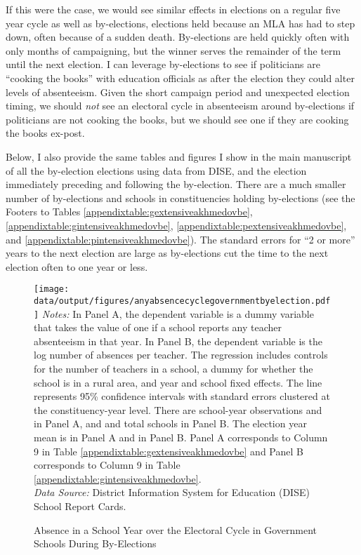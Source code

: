 \documentclass[hidelinks, 12pt, article, oneside]{memoir}
\begin{document}
If this were the case, we would see similar effects in elections on a regular five year cycle as well as by-elections, elections held because an MLA has had to step down, often because of a sudden death.  By-elections are held quickly often with only months of campaigning, but the winner serves the remainder of the term until the next election.  I can leverage by-elections to see if politicians are ``cooking the books'' with education officials as after the election they could alter levels of absenteeism.  Given the short campaign period and unexpected election timing, we should \emph{not} see an electoral cycle in absenteeism around by-elections if politicians are not cooking the books, but we should see one if they are cooking the books ex-post.

Below, I also provide the same tables and figures I show in the main manuscript of all the by-election elections using data from DISE, and the election immediately preceding and following the by-election.  There are a much smaller number of by-elections and schools in constituencies holding by-elections (see the Footers to Tables \ref{appendixtable:gextensiveakhmedovbe}, \ref{appendixtable:gintensiveakhmedovbe}, \ref{appendixtable:pextensiveakhmedovbe}, and \ref{appendixtable:pintensiveakhmedovbe}). The standard errors for ``2 or more'' years to the next election are large as by-elections cut the time to the next election often to one year or less.

\begin{figure}[htbp]
\caption{Absence in a School Year over the Electoral Cycle in Government Schools During By-Elections\label{fig:gbeextensiveakhmedov}}
\centering
\begin{minipage}{6.5in}
    \texttt{[image: data/output/figures/anyabsencecyclegovernmentbyelection.pdf]}
    \tiny \emph{Notes:} In Panel A, the dependent variable is a dummy variable that takes the value of one if a school reports any teacher absenteeism in that year. In Panel B, the dependent variable is the log number of absences per teacher. The regression includes controls for the number of teachers in a school, a dummy for whether the school is in a rural area, and year and school fixed effects.  The line represents 95\% confidence intervals with standard errors clustered at the constituency-year level.  There are  school-year observations and  in Panel A, and  and  total schools in Panel B. The election year mean is  in Panel A and  in Panel B.  Panel A corresponds to Column 9 in Table \ref{appendixtable:gextensiveakhmedovbe} and Panel B corresponds to Column 9 in Table \ref{appendixtable:gintensiveakhmedovbe}.\\
    \emph{Data Source:} District Information System for Education (DISE) School Report Cards.
\end{minipage}
\end{figure}
\end{document}
